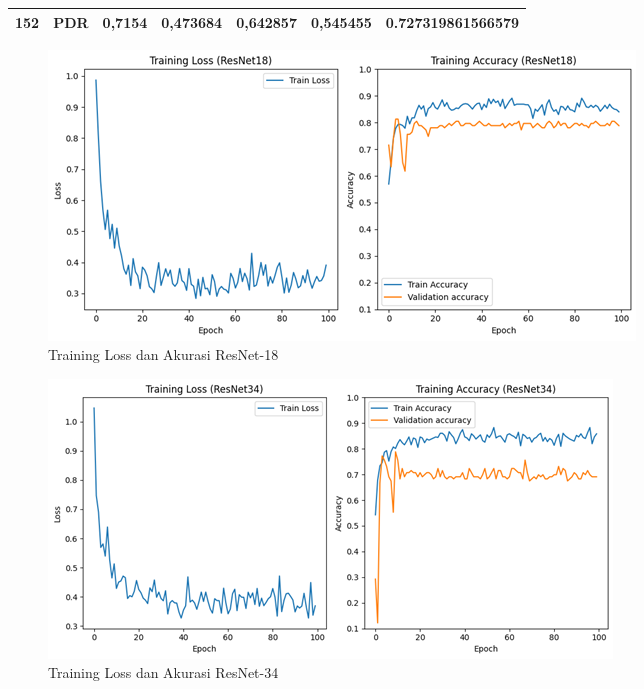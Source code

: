 \begin{table}[hbtp]
\begin{center}
\begin{tabular}{|c|l|c|l|l|l|c|}
            \multirow{-3}{*}{152} & PDR                                                & \multirow{-3}{*}{0,7154} & 0,473684                                          & 0,642857                                         & 0,545455                                        & \multirow{-3}{*}{0.727319861566579}  \\ \hline
            \end{tabular}
        \end{center}
    \end{table}

    \begin{figure}[!hbtp]
        \centering
        \includegraphics[scale=0.8]{gambar/TrainingGraphResNet18class-weighted.png}
        \caption{Training Loss dan Akurasi ResNet-18}
        \label{Img:GraphResNet18}
    \end{figure}
    \begin{figure}[hbtp]
        \centering
        \includegraphics[scale=0.85]{gambar/TrainingGraphResNet34class-weighted.png}
        \caption{Training Loss dan Akurasi ResNet-34}
        \label{Img:GraphResNet34}
    \end{figure}
